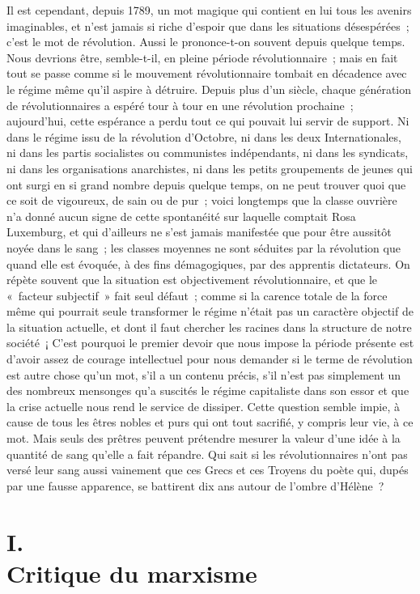 \documentclass[french,twoside]{book} %
\begin{document}
Il est cependant, depuis 1789, un mot magique qui contient en lui tous les avenirs imaginables, et n'est jamais si riche d'espoir que dans les situations désespérées ; c'est le mot de révolution. Aussi le prononce-t-on souvent depuis quelque temps. Nous devrions être, semble-t-il, en pleine période révolutionnaire ; mais en fait tout se passe comme si le mouvement révolutionnaire tombait en décadence avec le régime même qu'il aspire à détruire. Depuis plus d'un siècle, chaque génération de révolutionnaires a espéré tour à tour en une révolution prochaine ; aujourd'hui, cette espérance a perdu tout ce qui pouvait lui servir de support. Ni dans le régime issu de la révolution d'Octobre, ni dans les deux Internationales, ni dans les partis socialistes ou communistes indépendants, ni dans les syndicats, ni dans les organisations anarchistes, ni dans les petits groupements de jeunes qui ont surgi en si grand nombre depuis quelque temps, on ne peut trouver quoi que ce soit de vigoureux, de sain ou de pur ; voici longtemps que la classe ouvrière n'a donné aucun signe de cette spontanéité sur laquelle comptait Rosa Luxemburg, et qui d'ailleurs ne s'est jamais manifestée que pour être aussitôt noyée dans le sang ; les classes moyennes ne sont séduites par la révolution que quand elle est évoquée, à des fins démagogiques, par des apprentis dictateurs. On répète souvent que la situation est objectivement révolutionnaire, et que le « facteur subjectif » fait seul défaut ; comme si la carence totale de la force même qui pourrait seule transformer le régime n'était pas un caractère objectif de la situation actuelle, et dont il faut chercher les racines dans la structure de notre société ¡ C'est pourquoi le premier devoir que nous impose la période présente est d'avoir assez de courage intellectuel pour nous demander si le terme de révolution est autre chose qu'un mot, s'il a un contenu précis, s'il n'est pas simplement un des nombreux mensonges qu'a suscités le régime capitaliste dans son essor et que la crise actuelle nous rend le service de dissiper. Cette question semble impie, à cause de tous les êtres nobles et purs qui ont tout sacrifié, y compris leur vie, à ce mot. Mais seuls des prêtres peuvent prétendre mesurer la valeur d'une idée à la quantité de sang qu'elle a fait répandre. Qui sait si les révolutionnaires n'ont pas versé leur sang aussi vainement que ces Grecs et ces Troyens du poète qui, dupés par une fausse apparence, se battirent dix ans autour de l'ombre d'Hélène ?
\section[{I. Critique du marxisme}]{I. \\
Critique du marxisme}\renewcommand{\leftmark}{I. \\
Critique du marxisme}
\end{document}
